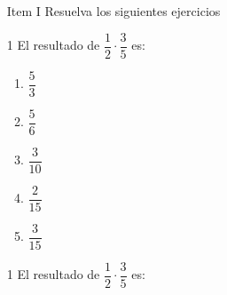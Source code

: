 \documentclass[12pt]{article}
\begin{document}
	\begin{enumerate}
		\item [Item I] Resuelva los siguientes ejercicios
		\item [1] El resultado de $\dfrac{1}{2} \cdot \dfrac{3}{5}$	es: 
	\begin{enumerate}
	\item $\dfrac{5}{3}$\\
	\item $\dfrac{5}{6}$\\
	\item $\dfrac{3}{10}$\\
	\item $\dfrac{2}{15}$\\
	\item $\dfrac{3}{15}$\\
\end{enumerate}
\item [1] El resultado de $\dfrac{1}{2} \cdot \dfrac{3}{5}$	es:
\end{enumerate}
\end{document}

